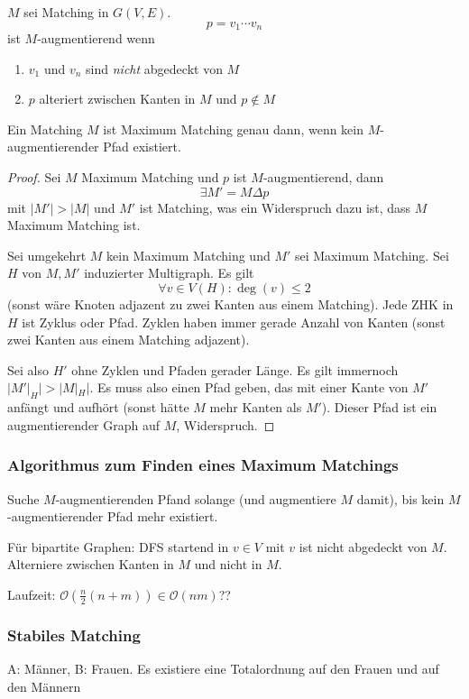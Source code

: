 \documentclass[11pt]{scrartcl}
\begin{document}
\begin{df}
$M$ sei Matching in $G(V,E)$.
\[
p=v_1\dotsb v_n
\]
ist $M$-augmentierend wenn
\begin{enumerate}
\item $v_1$ und $v_n$ sind \emph{nicht} abgedeckt von $M$
\item $p$ alteriert zwischen Kanten in $M$ und $p\not \in M$ 
\end{enumerate}

\end{df}

\begin{thm}[Bergel, 1957]
Ein Matching $M$ ist Maximum Matching genau dann, wenn kein $M$-augmentierender Pfad existiert.
\begin{proof}
Sei $M$ Maximum Matching und $p$ ist $M$-augmentierend, dann
\[
\exists M'=M\Delta p
\]
mit $|M'|>|M|$ und $M'$ ist Matching, was ein Widerspruch dazu ist, dass $M$ Maximum Matching ist.

Sei umgekehrt $M$ kein Maximum Matching und $M'$ sei Maximum Matching.
Sei $H$ von $M, M'$ induzierter Multigraph.
Es gilt
\[
\forall v\in V(H):\deg(v)\le 2
\]
(sonst wäre Knoten adjazent zu zwei Kanten aus einem Matching).
Jede ZHK in $H$ ist Zyklus oder Pfad.
Zyklen haben immer gerade Anzahl von Kanten (sonst zwei Kanten aus einem Matching adjazent).

Sei also $H'$ ohne Zyklen und Pfaden gerader Länge.
Es gilt immernoch $|M'|_H|>|M|_H|$.
Es muss also einen Pfad geben, das mit einer Kante von $M'$ anfängt und aufhört (sonst hätte $M$ mehr Kanten als $M'$).
Dieser Pfad ist ein augmentierender Graph auf $M$, Widerspruch.
\end{proof}
\end{thm}

\subsubsection{Algorithmus zum Finden eines Maximum Matchings}

Suche $M$-augmentierenden Pfand solange (und augmentiere $M$ damit), bis kein $M$-augmentierender Pfad mehr existiert.

Für bipartite Graphen:
DFS startend in $v\in V$ mit $v$ ist nicht abgedeckt von $M$.
Alterniere zwischen Kanten in $M$ und nicht in $M$.

Laufzeit: $\mathcal O(\frac n2(n+m)) \in \mathcal O(nm)$??

\subsubsection{Stabiles Matching}
A: Männer, B: Frauen.
Es existiere eine Totalordnung auf den Frauen und auf den Männern
\end{document}
